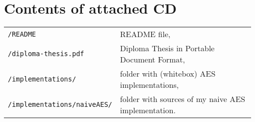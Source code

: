 \appendix
\cleardoublepage{}   %
\chapter{Contents of attached CD}

\begin{tabularx}{\textwidth}{p{7em} X}
	{\tt /README} & README file,\\
	{\tt /diploma-thesis.pdf} & Diploma Thesis in Portable Document Format,\\
	{\tt /implementations/} & folder with (whitebox) AES implementations,\\
	{\tt /implementations/naiveAES/} & folder with sources of my naive AES implementation.
\end{tabularx}
